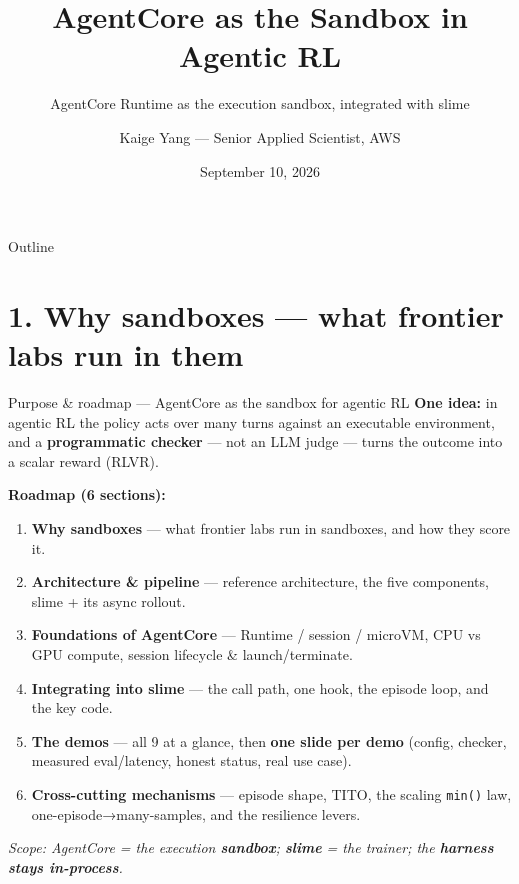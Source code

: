\documentclass[
  10pt,
  ignorenonframetext,
  aspectratio=169,
  t]{beamer}
\title{AgentCore as the Sandbox in Agentic RL}
\subtitle{AgentCore Runtime as the execution sandbox, integrated with
slime}
\author{Kaige Yang --- Senior Applied Scientist, AWS}
\date{September 10, 2026}
\providecommand{\tightlist}{%
  \setlength{\itemsep}{0pt}\setlength{\parskip}{0pt}}
\begin{document}
\frame{\titlepage}

\begin{frame}[allowframebreaks]{Outline}
\protect\hypertarget{outline}{}
\tableofcontents
\end{frame}

\hypertarget{why-sandboxes-what-frontier-labs-run-in-them}{%
\section{1. Why sandboxes --- what frontier labs run in
them}\label{why-sandboxes-what-frontier-labs-run-in-them}}

\begin{frame}{Purpose \& roadmap --- AgentCore as the sandbox
for agentic RL}
\protect\hypertarget{purpose-roadmap-agentcore-as-the-sandbox-for-agentic-rl}{}
\textbf{One idea:} in agentic RL the policy acts over many turns against
an executable environment, and a \textbf{programmatic checker} --- not
an LLM judge --- turns the outcome into a scalar reward (RLVR).

\textbf{Roadmap (6 sections):}

\begin{enumerate}
\tightlist
\item
  \textbf{Why sandboxes} --- what frontier labs run in sandboxes, and
  how they score it.
\item
  \textbf{Architecture \& pipeline} --- reference architecture, the five
  components, slime + its async rollout.
\item
  \textbf{Foundations of AgentCore} --- Runtime / session / microVM, CPU
  vs GPU compute, session lifecycle \& launch/terminate.
\item
  \textbf{Integrating into slime} --- the call path, one hook, the
  episode loop, and the key code.
\item
  \textbf{The demos} --- all 9 at a glance, then \textbf{one slide per
  demo} (config, checker, measured eval/latency, honest status, real use
  case).
\item
  \textbf{Cross-cutting mechanisms} --- episode shape, TITO, the scaling
  \texttt{min()} law, one-episode→many-samples, and the resilience
  levers.
\end{enumerate}

\emph{Scope: AgentCore = the execution \textbf{sandbox}; \textbf{slime}
= the trainer; the \textbf{harness stays in-process}.}
\end{frame}
\end{document}
